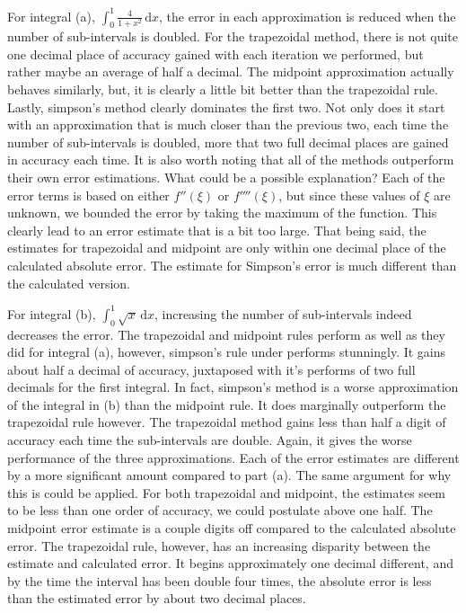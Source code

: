 \documentclass{article}
\begin{document}
\begin{enumerate}[label = {\arabic*}]
		\hspace{15pt} For integral (a), $\int_{0}^{1} \frac{4}{1 + x^2} \, \mathrm{d}x$, the error in each approximation is reduced when the number of sub-intervals is doubled. For the trapezoidal method, there is not quite one decimal place of accuracy gained with each iteration we performed, but rather maybe an average of half a decimal. The midpoint approximation actually behaves similarly, but, it is clearly a little bit better than the trapezoidal rule. Lastly, simpson's method clearly dominates the first two. Not only does it start with an approximation that is much closer than the previous two, each time the number of sub-intervals is doubled, more that two full decimal places are gained in accuracy each time. It is also worth noting that all of the methods outperform their own error estimations. What could be a possible explanation? Each of the error terms is based on either $f''(\xi)$ or $f''''(\xi)$, but since these values of $\xi$ are unknown, we bounded the error by taking the maximum of the function. This clearly lead to an error estimate that is a bit too large. That being said, the estimates for trapezoidal and midpoint are only within one decimal place of the calculated absolute error. The estimate for Simpson's error is much different than the calculated version.
		
		\hspace{15pt} For integral (b), $\int_{0}^{1} \sqrt{x} \, \mathrm{d}x$, increasing the number of sub-intervals indeed decreases the error. The trapezoidal and midpoint rules perform as well as they did for integral (a), however, simpson's rule under performs stunningly. It gains about half a decimal of accuracy, juxtaposed with it's performs of two full decimals for the first integral. In fact, simpson's method is a worse approximation of the integral in (b) than the midpoint rule. It does marginally outperform the trapezoidal rule however. The trapezoidal method gains less than half a digit of accuracy each time the sub-intervals are double. Again, it gives the worse performance of the three approximations. Each of the error estimates are different by a more significant amount compared to part (a). The same argument for why this is could be applied. For both trapezoidal and midpoint, the estimates seem to be less than one order of accuracy, we could postulate above one half. The midpoint error estimate is a couple digits off compared to the calculated absolute error. The trapezoidal rule, however, has an increasing disparity between the estimate and calculated error. It begins approximately one decimal different, and by the time the interval has been double four times, the absolute error is less than the estimated error by about two decimal places.
		

\end{enumerate}
\end{document}
